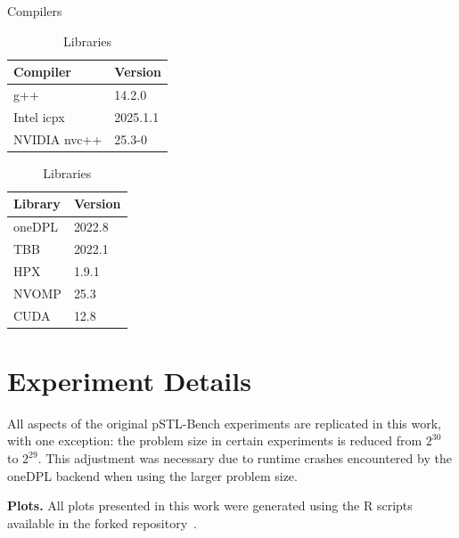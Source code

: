 \documentclass[sigconf]{acmart}
\newcommand{\mypar}[1]{{\bf #1.}}
\begin{document}
\begin{table}[H]
      \centering
      \begin{minipage}[t]{0.48\linewidth}
            \centering
            \caption{Compilers}\label{tab:compilers}
            \begin{tabular}{|l|l|}
                  \hline
                  \textbf{Compiler} & \textbf{Version} \\
                  \hline
                  g++               & 14.2.0           \\
                  Intel icpx        & 2025.1.1         \\
                  NVIDIA nvc++      & 25.3-0           \\
                  \hline
            \end{tabular}
      \end{minipage}
      \hfill
      \begin{minipage}[t]{0.48\linewidth}
            \centering
            \caption{Libraries}\label{tab:libraries}
            \begin{tabular}{|l|l|}
                  \hline
                  \textbf{Library} & \textbf{Version} \\
                  \hline
                  oneDPL           & 2022.8           \\
                  TBB              & 2022.1           \\
                  HPX              & 1.9.1            \\
                  NVOMP            & 25.3             \\
                  CUDA             & 12.8             \\
                  \hline
            \end{tabular}
      \end{minipage}
\end{table}

\section{Experiment Details}\label{sec:exp_details}
All aspects of the original pSTL-Bench experiments are replicated in this work,
with one exception: the problem size in certain experiments is reduced from
$2^{30}$ to $2^{29}$. This adjustment was necessary due to runtime crashes
encountered by the oneDPL backend when using the larger problem size.

\mypar{Plots} All plots presented in this work were generated using the R scripts available
in the forked repository~\cite{pSTL-Bench_fork:github}.
\end{document}
